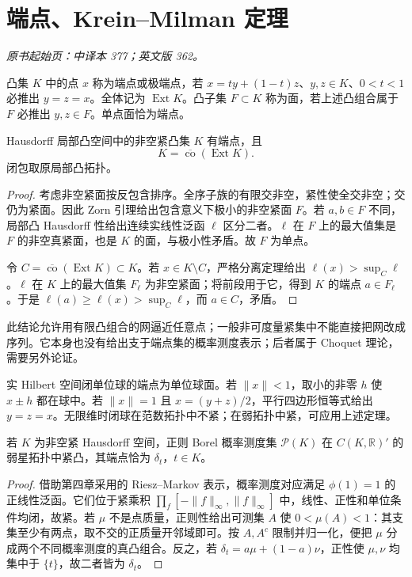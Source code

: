 \section{端点、Krein--Milman 定理}\label{sec:yosida-12-01}
\noindent\textit{原书起始页：中译本 377；英文版 362。}

\begin{definition}[端点与面]
凸集 $K$ 中的点 $x$ 称为端点或极端点，若 $x=ty+(1-t)z$、$y,z\in K$、$0<t<1$ 必推出 $y=z=x$。全体记为 $\operatorname{Ext}K$。凸子集 $F\subset K$ 称为面，若上述凸组合属于 $F$ 必推出 $y,z\in F$。单点面恰为端点。
\end{definition}

\begin{theorem}\label{thm:y12-krein-milman}
Hausdorff 局部凸空间中的非空紧凸集 $K$ 有端点，且
\[
 K=\overline{\operatorname{co}}(\operatorname{Ext}K).
\]
闭包取原局部凸拓扑。
\end{theorem}
\begin{proof}
考虑非空紧面按反包含排序。全序子族的有限交非空，紧性使全交非空；交仍为紧面。因此 Zorn 引理给出包含意义下极小的非空紧面 $F$。若 $a,b\in F$ 不同，局部凸 Hausdorff 性给出连续实线性泛函 $\ell$ 区分二者。$\ell$ 在 $F$ 上的最大值集是 $F$ 的非空真紧面，也是 $K$ 的面，与极小性矛盾。故 $F$ 为单点。

令 $C=\overline{\operatorname{co}}(\operatorname{Ext}K)\subset K$。若 $x\in K\setminus C$，严格分离定理给出 $\ell(x)>\sup_C\ell$。$\ell$ 在 $K$ 上的最大值集 $F_\ell$ 为非空紧面；将前段用于它，得到 $K$ 的端点 $a\in F_\ell$。于是 $\ell(a)\ge\ell(x)>\sup_C\ell$，而 $a\in C$，矛盾。
\end{proof}

此结论允许用有限凸组合的网逼近任意点；一般非可度量紧集中不能直接把网改成序列。它本身也没有给出支于端点集的概率测度表示；后者属于 Choquet 理论，需要另外论证。

\begin{example}[Hilbert 球]
实 Hilbert 空间闭单位球的端点为单位球面。若 $\|x\|<1$，取小的非零 $h$ 使 $x\pm h$ 都在球中。若 $\|x\|=1$ 且 $x=(y+z)/2$，平行四边形恒等式给出 $y=z=x$。无限维时闭球在范数拓扑中不紧；在弱拓扑中紧，可应用上述定理。
\end{example}

\begin{proposition}[概率测度的端点]\label{prop:y12-probability-extreme}
若 $K$ 为非空紧 Hausdorff 空间，正则 Borel 概率测度集 $\mathcal P(K)$ 在 $C(K,\mathbb R)'$ 的弱星拓扑中紧凸，其端点恰为 $\delta_t$，$t\in K$。
\end{proposition}
\begin{proof}
借助第四章采用的 Riesz--Markov 表示，概率测度对应满足 $\phi(1)=1$ 的正线性泛函。它们位于紧乘积 $\prod_f[-\|f\|_\infty,\|f\|_\infty]$ 中，线性、正性和单位条件均闭，故紧。若 $\mu$ 不是点质量，正则性给出可测集 $A$ 使 $0<\mu(A)<1$：其支集至少有两点，取不交的正质量开邻域即可。按 $A,A^c$ 限制并归一化，便把 $\mu$ 分成两个不同概率测度的真凸组合。反之，若 $\delta_t=a\mu+(1-a)\nu$，正性使 $\mu,\nu$ 均集中于 $\{t\}$，故二者皆为 $\delta_t$。
\end{proof}

